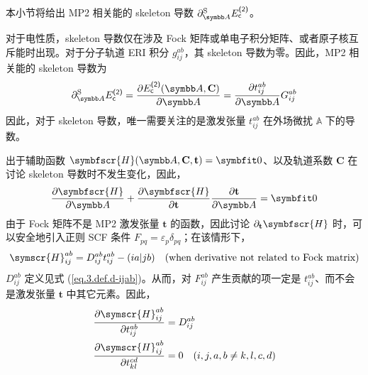 本小节将给出 MP2 相关能的 skeleton 导数 $\partial_\mathbb{A}^\mathrm{S} E_\textmt{c}^\textmt{(2)}$。

对于电性质，skeleton 导数仅在涉及 Fock 矩阵或单电子积分矩阵、或者原子核互斥能时出现。对于分子轨道 ERI 积分 $g_{ij}^{ab}$，其 skeleton 导数为零。因此，MP2 相关能的 skeleton 导数为
\begin{equation}
    \label{eq.3.pdSA-Ec-MP2-0}
    \partial_\mathbb{A}^\mathrm{S} E_\textmt{c}^\textmt{(2)} = \frac{\partial E_\textmt{c}^\textmt{(2)} (\mathbb{A}, \mathbf{C})}{\partial \mathbb{A}} = \frac{\partial t_{ij}^{ab}}{\partial \mathbb{A}} G_{ij}^{ab}
\end{equation}
因此，对于 skeleton 导数，唯一需要关注的是激发张量 $t_{ij}^{ab}$ 在外场微扰 $\mathbb{A}$ 下的导数。

出于辅助函数 $\symbfscr{H} (\mathbb{A}, \mathbf{C}, \mathbf{t}) = \bm{0}$、以及轨道系数 $\mathbf{C}$ 在讨论 skeleton 导数时不发生变化，因此，
\begin{equation}
    \label{eq.3.auxfunc-pdA}
    \frac{\partial \symbfscr{H}}{\partial \mathbb{A}} + \frac{\partial \symbfscr{H}}{\partial \mathbf{t}} \frac{\partial \mathbf{t}}{\partial \mathbb{A}} = \bm{0}
\end{equation}
由于 Fock 矩阵不是 MP2 激发张量 $\mathbf{t}$ 的函数，因此讨论 $\partial_\mathbf{t} \symbfscr{H}$ 时，可以安全地引入正则 SCF 条件 $F_{pq} = \varepsilon_p \delta_{pq}$；在该情形下，
\begin{equation*}
    \symscr{H}_{ij}^{ab} = D_{ij}^{ab} t_{ij}^{ab} - (ia|jb) \quad \text{(when derivative not related to Fock matrix)}
\end{equation*}
$D_{ij}^{ab}$ 定义见式 (\ref{eq.3.def.d-ijab})。从而，对 $F_{ij}^{ab}$ 产生贡献的项一定是 $t_{ij}^{ab}$、而不会是激发张量 $\mathbf{t}$ 中其它元素。因此，
\begin{align}
    \label{eq.3.auxfunc-pdt}
    \frac{\partial \symscr{H}_{ij}^{ab}}{\partial t_{ij}^{ab}} &= D_{ij}^{ab} \\
    \frac{\partial \symscr{H}_{ij}^{ab}}{\partial t_{kl}^{cd}} &= 0 \quad (i,j,a,b \neq k,l,c,d)
\end{align}

